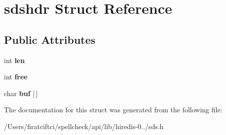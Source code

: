 \hypertarget{structsdshdr}{}\section{sdshdr Struct Reference}
\label{structsdshdr}
\subsection*{Public Attributes}
\begin{DoxyCompactItemize}
\item 
\mbox{\label{structsdshdr_a6550b193c38a86423fcfb1b14779b117}} 
int {\bfseries len}
\item 
\mbox{\label{structsdshdr_a37a1284cc7168d3ac6b6fceabad74b8c}} 
int {\bfseries free}
\item 
\mbox{\label{structsdshdr_af505c8157c3faec30b8e32f0b552fc12}} 
char {\bfseries buf} \mbox{[}$\,$\mbox{]}
\end{DoxyCompactItemize}


The documentation for this struct was generated from the following file\+:\begin{DoxyCompactItemize}
\item 
/\+Users/firatciftci/spellcheck/api/lib/hiredis-\/0../sds.\+h\end{DoxyCompactItemize}
